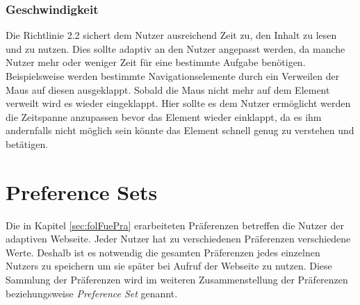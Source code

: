 \documentclass[12pt, paper=a4, bibtotoc, toc=listof, headsepline=true]{scrreprt}
\begin{document}
\subsection{Geschwindigkeit}
Die Richtlinie 2.2 sichert dem Nutzer ausreichend Zeit zu, den Inhalt zu lesen und zu nutzen. Dies sollte adaptiv an den Nutzer angepasst werden, da manche Nutzer mehr oder weniger Zeit für eine bestimmte Aufgabe benötigen. Beispielsweise werden bestimmte Navigationselemente durch ein Verweilen der Maus auf diesen ausgeklappt. Sobald die Maus nicht mehr auf dem Element verweilt wird es wieder eingeklappt. Hier sollte es dem Nutzer ermöglicht werden die Zeitspanne anzupassen bevor das Element wieder einklappt, da es ihm andernfalls nicht möglich sein könnte das Element schnell genug zu verstehen und betätigen.
\chapter{Preference Sets}
Die in Kapitel \ref{sec:folFuePra} erarbeiteten Präferenzen betreffen die Nutzer der adaptiven Webseite. Jeder Nutzer hat zu verschiedenen Präferenzen verschiedene Werte. Deshalb ist es notwendig die gesamten Präferenzen jedes einzelnen Nutzers zu speichern um sie später bei Aufruf der Webseite zu nutzen. Diese Sammlung der Präferenzen wird im weiteren Zusammenstellung der Präferenzen beziehungsweise \emph{Preference Set} genannt. 
\end{document}
